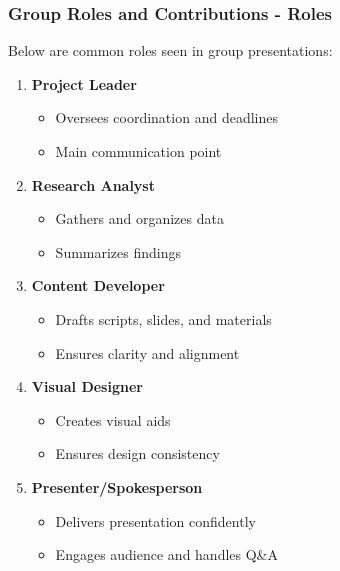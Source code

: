 \documentclass{beamer}
\begin{document}
\begin{frame}[fragile]
    \frametitle{Group Roles and Contributions - Roles}
    Below are common roles seen in group presentations:

    \begin{enumerate}
        \item \textbf{Project Leader}
            \begin{itemize}
                \item Oversees coordination and deadlines
                \item Main communication point
            \end{itemize}
        \item \textbf{Research Analyst}
            \begin{itemize}
                \item Gathers and organizes data
                \item Summarizes findings
            \end{itemize}
        \item \textbf{Content Developer}
            \begin{itemize}
                \item Drafts scripts, slides, and materials
                \item Ensures clarity and alignment
            \end{itemize}
        \item \textbf{Visual Designer}
            \begin{itemize}
                \item Creates visual aids
                \item Ensures design consistency
            \end{itemize}
        \item \textbf{Presenter/Spokesperson}
            \begin{itemize}
                \item Delivers presentation confidently
                \item Engages audience and handles Q&A
            \end{itemize}
    \end{enumerate}
\end{frame}
\end{document}
